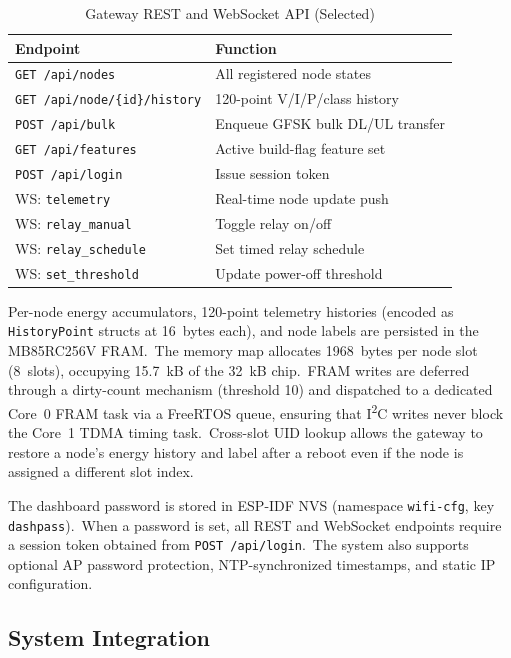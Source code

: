 \documentclass[conference]{IEEEtran}
\begin{document}
\begin{table}[t]
  \caption{Gateway REST and WebSocket API (Selected)}
  \label{tab:api}
  \centering
  \small
  \begin{tabular}{lp{5.0cm}}
    \toprule
    Endpoint & Function \\
    \midrule
    \texttt{GET /api/nodes}           & All registered node states \\
    \texttt{GET /api/node/\{id\}/history} & 120-point V/I/P/class history \\
    \texttt{POST /api/bulk}           & Enqueue GFSK bulk DL/UL transfer \\
    \texttt{GET /api/features}        & Active build-flag feature set \\
    \texttt{POST /api/login}          & Issue session token \\
    WS: \texttt{telemetry}            & Real-time node update push \\
    WS: \texttt{relay\_manual}        & Toggle relay on/off \\
    WS: \texttt{relay\_schedule}      & Set timed relay schedule \\
    WS: \texttt{set\_threshold}       & Update power-off threshold \\
    \bottomrule
  \end{tabular}
\end{table}

Per-node energy accumulators, 120-point telemetry histories
(encoded as \texttt{HistoryPoint} structs at 16~bytes each), and node
labels are persisted in the MB85RC256V FRAM.\ The memory map allocates
1968~bytes per node slot (8~slots), occupying 15.7~kB of the 32~kB
chip.\ FRAM writes are deferred through a dirty-count mechanism
(threshold 10) and dispatched to a dedicated Core~0 FRAM task via a
FreeRTOS queue, ensuring that I\textsuperscript{2}C writes never block
the Core~1 TDMA timing task.\ Cross-slot UID lookup allows the
gateway to restore a node's energy history and label after a reboot
even if the node is assigned a different slot index.

The dashboard password is stored in ESP-IDF NVS (namespace
\texttt{wifi-cfg}, key \texttt{dashpass}).\ When a password is set,
all REST and WebSocket endpoints require a session token obtained from
\texttt{POST /api/login}.\ The system also supports optional AP
password protection, NTP-synchronized timestamps, and static IP
configuration.

\subsection{System Integration}
\label{ssec:integration}
\end{document}
